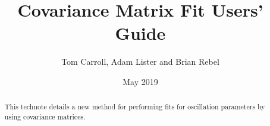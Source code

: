 \documentclass[12pt]{article}
\title{Covariance Matrix Fit Users' Guide}
\author{Tom Carroll, Adam Lister and Brian Rebel}
\date{May 2019}
\begin{document}
\maketitle

\begin{abstract}
    This technote details a new method for performing fits for oscillation parameters by using covariance matrices.
\end{abstract}

\tableofcontents






\end{document}
